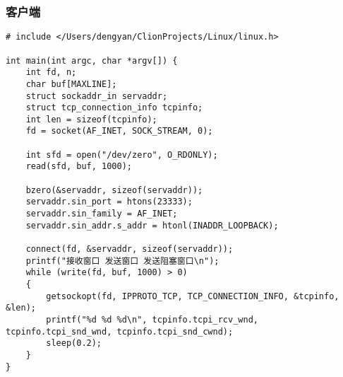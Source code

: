 \subsubsection{客户端}
\begin{verbatim}
# include </Users/dengyan/ClionProjects/Linux/linux.h>

int main(int argc, char *argv[]) {
    int fd, n;
    char buf[MAXLINE];
    struct sockaddr_in servaddr;
    struct tcp_connection_info tcpinfo;
    int len = sizeof(tcpinfo);
    fd = socket(AF_INET, SOCK_STREAM, 0);

    int sfd = open("/dev/zero", O_RDONLY);
    read(sfd, buf, 1000);

    bzero(&servaddr, sizeof(servaddr));
    servaddr.sin_port = htons(23333);
    servaddr.sin_family = AF_INET;
    servaddr.sin_addr.s_addr = htonl(INADDR_LOOPBACK);

    connect(fd, &servaddr, sizeof(servaddr));
    printf("接收窗口 发送窗口 发送阻塞窗口\n");
    while (write(fd, buf, 1000) > 0)
    {
        getsockopt(fd, IPPROTO_TCP, TCP_CONNECTION_INFO, &tcpinfo, &len);
        printf("%d %d %d\n", tcpinfo.tcpi_rcv_wnd, tcpinfo.tcpi_snd_wnd, tcpinfo.tcpi_snd_cwnd);
        sleep(0.2);
    }
}
\end{verbatim}

